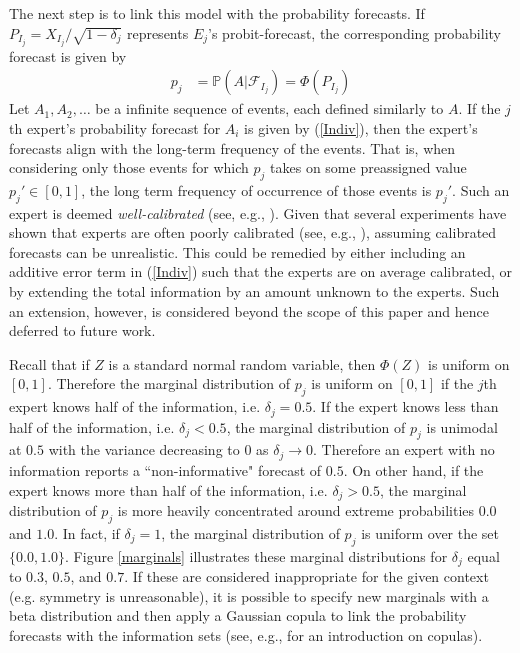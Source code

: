\documentclass[11pt]{article}
\renewcommand{\P}{\mathbb{P}}
\theoremstyle{definition}
\theoremstyle{definition}
\begin{document}
The next step is to link this model with the probability forecasts. If  $P_{I_j} = X_{I_j}/\sqrt{1-\delta_j}$ represents $E_j$'s probit-forecast, the corresponding probability forecast is given by
\begin{align}
p_j &= \P\left(A | \mathcal{F}_{I_j}\right) = \Phi\left( P_{I_j}\right) \label{Indiv}
\end{align}
Let $A_1, A_2, \dots$ be a infinite sequence of events, each defined similarly to $A$. If the $j$th expert's probability forecast for $A_i$ is given by (\ref{Indiv}), then the expert's forecasts align with the long-term frequency of the events. That is, when considering only those events for which $p_j$ takes on some preassigned value $p_j' \in [0, 1]$, the long term frequency of occurrence of those events is $p_j'$. Such an expert is deemed \textit{well-calibrated} (see, e.g., \cite{degroot1983comparison}). Given that several experiments have shown that experts are often poorly calibrated (see, e.g., \cite{cooke1991experts, shlyakhter1994quantifying}), assuming calibrated forecasts can be unrealistic. This could be remedied by  either including an additive error term in (\ref{Indiv}) such that the experts are on average calibrated, or by extending the total information by an amount unknown to the experts. Such an extension, however, is considered beyond the scope of this paper and hence deferred to future work. 

Recall that if $Z$ is a standard normal random variable, then $\Phi(Z)$ is uniform on $[0,1]$. Therefore the marginal distribution of $p_j$ is uniform on $[0,1]$ if the $j$th expert knows half of the information, i.e. $\delta_j = 0.5$. If the expert knows less than half of the information, i.e. $\delta_j < 0.5$, the marginal distribution of $p_j$ is unimodal at $0.5$ with the variance decreasing to 0 as $\delta_j \to 0$. Therefore an expert with no information reports a ``non-informative" forecast of $0.5$. On other hand, if the expert knows more than half of the information, i.e. $\delta_j > 0.5$, the marginal  distribution of $p_j$ is more heavily concentrated around extreme probabilities $0.0$ and $1.0$. In fact, if $\delta_j = 1$, the marginal distribution of $p_j$ is uniform over the set $\{0.0,1.0\}$. Figure \ref{marginals} illustrates these marginal distributions for $\delta_j$ equal to $0.3$, $0.5$, and $0.7$. If these are considered inappropriate for the given context (e.g. symmetry is  unreasonable), it is possible to specify new marginals with a beta distribution and then apply a Gaussian copula to link the probability forecasts with the information sets (see, e.g.,  \cite{nelsen1999introduction} for an introduction on copulas). 
\end{document}
